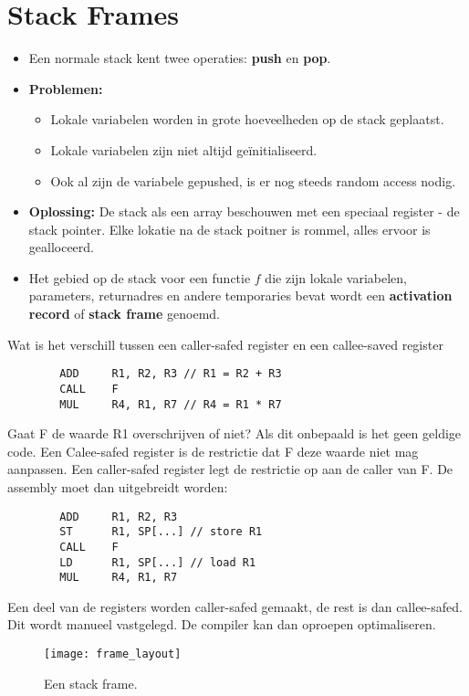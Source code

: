 \section{Stack Frames}
\begin{itemize}
	\item Een normale stack kent twee operaties: \textbf{push} en \textbf{pop}.
	\item \textbf{Problemen:}
	\begin{itemize}
		\item Lokale variabelen worden in grote hoeveelheden op de stack geplaatst. 
		\item Lokale variabelen zijn niet altijd geïnitialiseerd.
		\item Ook al zijn de variabele gepushed, is er nog steeds random access nodig.
	\end{itemize}  
	\item \textbf{Oplossing:} De stack als een array beschouwen met een speciaal register - de stack pointer. Elke lokatie na de stack poitner is rommel, alles ervoor is gealloceerd.
	\item Het gebied op de stack voor een functie $f$ die zijn lokale variabelen, parameters, returnadres en andere temporaries bevat wordt een \textbf{activation record} of \textbf{stack frame} genoemd.
\end{itemize}



Wat is het verschill tussen een caller-safed register en een callee-saved register

		\begin{lstlisting}
		ADD		R1, R2, R3 // R1 = R2 + R3
		CALL	F
		MUL		R4, R1, R7 // R4 = R1 * R7
		\end{lstlisting}
		Gaat F de waarde R1 overschrijven of niet? Als dit onbepaald is het geen geldige code. Een Calee-safed register is de restrictie dat F deze waarde niet mag aanpassen. Een caller-safed register legt de restrictie op aan de caller van F. De assembly moet dan uitgebreidt worden:
		\begin{lstlisting}
		ADD		R1, R2, R3
		ST		R1, SP[...] // store R1 
		CALL	F
		LD      R1, SP[...] // load R1
		MUL		R4, R1, R7
		\end{lstlisting}
		Een deel van de registers worden caller-safed gemaakt, de rest is dan callee-safed. Dit wordt manueel vastgelegd. De compiler kan dan oproepen optimaliseren.



\begin{figure}
	\texttt{[image: frame\_layout]}
	\caption{Een stack frame.}
	\label{fig:stack_frame}
\end{figure}



